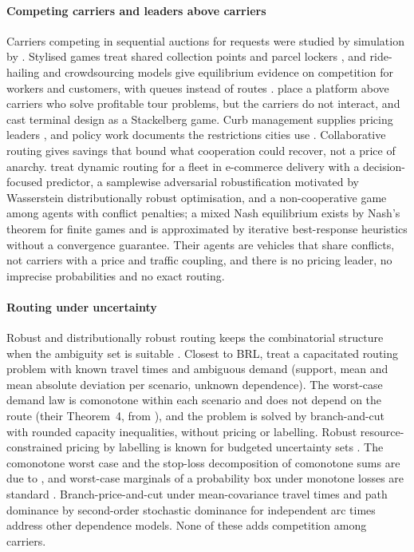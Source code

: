 \documentclass[preprint,12pt]{elsarticle}
\theoremstyle{definition}
\theoremstyle{remark}
\begin{document}
\paragraph{Competing carriers and leaders above carriers} Carriers competing in sequential auctions for requests were studied by simulation by \citet{Figliozzi2004,Figliozzi2007}. Stylised games treat shared collection points and parcel lockers \citep{Li2024,Mercurio2026}, and ride-hailing and crowdsourcing models give equilibrium evidence on competition for workers and customers, with queues instead of routes \citep{Taylor2018,Bernstein2021,Benjaafar2022,Alnaggar2021,Mancini2022}. \citet{Cerulli2024} place a platform above carriers who solve profitable tour problems, but the carriers do not interact, and \citet{Catalano2014} cast terminal design as a Stackelberg game. Curb management supplies pricing leaders \citep{XuSun2024,LiuMaQian2023}, and policy work documents the restrictions cities use \citep{Quak2009,HolguinVeras2016,Dey2019}. Collaborative routing \citep{GanstererHartl2018,Cleophas2019,Los2025} gives savings that bound what cooperation could recover, not a price of anarchy. \citet{LiuMaMa2026} treat dynamic routing for a fleet in e-commerce delivery with a decision-focused predictor, a samplewise adversarial robustification motivated by Wasserstein distributionally robust optimisation, and a non-cooperative game among agents with conflict penalties; a mixed Nash equilibrium exists by Nash's theorem for finite games and is approximated by iterative best-response heuristics without a convergence guarantee. Their agents are vehicles that share conflicts, not carriers with a price and traffic coupling, and there is no pricing leader, no imprecise probabilities and no exact routing.

\paragraph{Routing under uncertainty} Robust and distributionally robust routing keeps the combinatorial structure when the ambiguity set is suitable \citep{Gounaris2013,GhosalWiesemann2020,Zhang2021,Jaillet2016,Adulyasak2016}. Closest to BRL, \citet{GhosalHoWiesemann2024} treat a capacitated routing problem with known travel times and ambiguous demand (support, mean and mean absolute deviation per scenario, unknown dependence). The worst-case demand law is comonotone within each scenario and does not depend on the route (their Theorem~4, from \citealp{LongQiZhang2024}), and the problem is solved by branch-and-cut with rounded capacity inequalities, without pricing or labelling. Robust resource-constrained pricing by labelling is known for budgeted uncertainty sets \citep{Pessoa2015,Pugliese2019}. The comonotone worst case and the stop-loss decomposition of comonotone sums are due to \citet{Meilijson1979} \citep[see also][]{Tchen1980,Kaas2000,Dhaene2002}, and worst-case marginals of a probability box under monotone losses are standard \citep{Williamson1990}. Branch-price-and-cut under mean-covariance travel times \citep{Rostami2021} and path dominance by second-order stochastic dominance for independent arc times \citep{Nie2012} address other dependence models. None of these adds competition among carriers.
\end{document}
